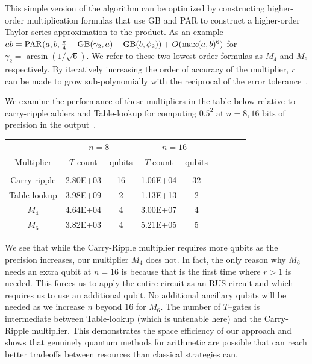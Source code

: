 \documentclass[conference]{IEEEtran}
\begin{document}
This simple version of the algorithm can be optimized by constructing higher-order multiplication formulas that use GB and PAR to construct a higher-order Taylor series approximation to the product.  As an example ${ab=\rm PAR}(a,b,\frac{\pi}{4}- {\rm GB}(\gamma_2,a)-{\rm GB}(b,\phi_2))+ O(\max(a,b)^6)$ for $\gamma_2 =\arcsin(1/\sqrt{6})$.  We refer to these two lowest order formulas as $M_4$ and $M_6$ respectively.  By iteratively increasing the order of accuracy of the multiplier, $r$ can be made to grow sub-polynomially with the reciprocal of the error tolerance~\cite{WR16}.

We examine the performance of these multipliers in the table below relative to carry-ripple adders and Table-lookup for computing $0.5^2$ at $n=8,16$ bits of precision in the output~\cite{WR16}.
\begin{table}[hbt]
\centering
\footnotesize
\begin{tabular}{c@{\qquad}c@{\quad}c@{\qquad}c@{\quad}c@{\qquad}c@{\quad}c@{\qquad}c@{\quad}c}
\hline
 & \multicolumn{2}{c}{$n=8$\phantom{111}} & \multicolumn{2}{c}{$n=16$} \\[0.2ex]
 {Multiplier}    & $T$-count & qubits & $T$-count & qubits \\
\hline\\
Carry-ripple & 2.80E+03 & 16 & 1.06E+04  &32\\[1.5ex]
Table-lookup  & 3.98E+09 & 2 & 1.13E+13& 2\\[1.5ex]
$M_4$  &4.64E+04 &4 &3.00E+07 &4 \\[1.5ex] 
$M_6$  &3.82E+03 &4 & 5.21E+05&5 \\ 
\hline
\end{tabular}
\end{table}

We see that while the Carry-Ripple multiplier requires more qubits as the precision increases, our multiplier $M_4$ does not.  In fact, the only reason why $M_6$ needs an extra qubit at $n=16$ is because that is the first time where $r>1$ is needed.  This forces us to apply the entire circuit as an RUS-circuit and which requires us to use an additional qubit.  No additional ancillary qubits will be needed as we increase $n$ beyond $16$ for $M_6$.  The number of $T$--gates is intermediate between Table-lookup (which is untenable here) and the Carry-Ripple multiplier.  This demonstrates the space efficiency of our approach and shows that genuinely quantum methods for arithmetic are possible that can reach better tradeoffs between resources than classical strategies can.
\end{document}
